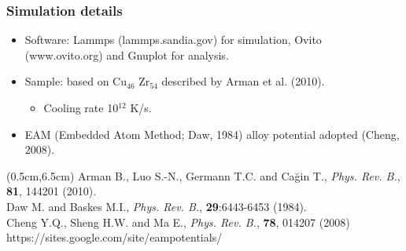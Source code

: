\documentclass[12pt,t]{beamer}
\begin{document}
\begin{frame}
    \frametitle{Simulation details}
    \vspace{0.2cm}
    \begin{itemize}
        \item Software: Lammps (lammps.sandia.gov) for simulation, Ovito (www.ovito.org) and Gnuplot for analysis.
        \item Sample: based on Cu$_{46}$ Zr$_{54}$ described by Arman et al. (2010).
        \begin{itemize}
            \item Cooling rate 10$^{12}$ K/s.
        \end{itemize}
        \item EAM (Embedded Atom Method; Daw, 1984) alloy potential adopted (Cheng, 2008).
    \end{itemize}
    \begin{textblock*}{12cm}(0.5cm,6.5cm) %
        \small{Arman B., Luo S.-N., Germann T.C. and Cağin T., \textit{Phys. Rev. B.}, \textbf{81}, 144201 (2010).\\
        Daw M. and Baskes M.I., \textit{Phys. Rev. B.}, \textbf{29}:6443-6453 (1984).\\
        Cheng Y.Q., Sheng H.W. and Ma E., \textit{Phys. Rev. B.}, \textbf{78}, 014207 (2008) https://sites.google.com/site/eampotentials/}
    \end{textblock*}
\end{frame}

\end{document}
